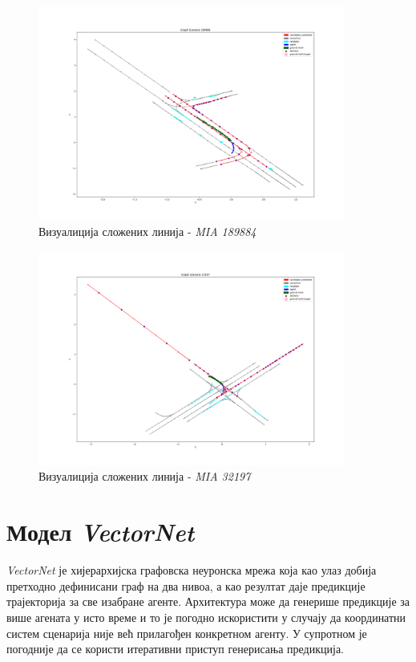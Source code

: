 \documentclass[11pt,oneside]{memoir}
\begin{document}
\begin{figure}[H]
  \centering
  \includegraphics[width=0.9\textwidth]{images/polylines_MIA_189984.png}
  \caption{Визуалиција сложених линија - \textit{MIA 189884} \label{poly-MIA-189984}}
\end{figure}

\begin{figure}[H]
  \centering
  \includegraphics[width=0.9\textwidth]{images/polylines_MIA_32197.png}
  \caption{Визуалиција сложених линија - \textit{MIA 32197} \label{poly-MIA-32197}}
\end{figure}

\section{Модел \textit{VectorNet}}

\textit{VectorNet} је хијерархијска графовска неуронска мрежа која као улаз добија претходно дефинисани граф на два нивоа, а као резултат
даје предикције трајекторија за све изабране агенте. Архитектура може да генерише предикције за више агената у исто време и то
је погодно искористити у случају да координатни систем сценарија није већ прилагођен конкретном агенту. У супротном је погодније
да се користи итеративни приступ генерисања предикција. 
\end{document}
